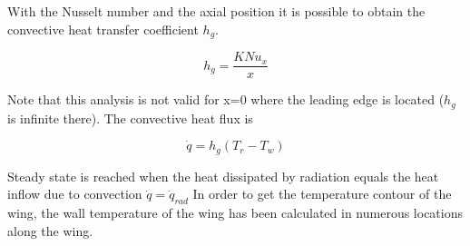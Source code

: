 With the Nusselt number and the axial position it is possible to obtain the convective heat transfer coefficient $h_g$.

\begin{equation}
h_g=\frac{K Nu_x}{x}
\end{equation}

Note that this analysis is not valid for x=0 where the leading edge is located ($h_g$ is infinite there).
The convective heat flux is 

\begin{equation}
\dot{q}=h_g (T_r-T_w)
\end{equation}


Steady state is reached when the heat dissipated by radiation equals the heat inflow due to convection $\dot{q}=\dot{q}_{rad}$
In order to get the temperature contour of the wing, the wall temperature of the wing has been calculated in numerous locations along the wing.